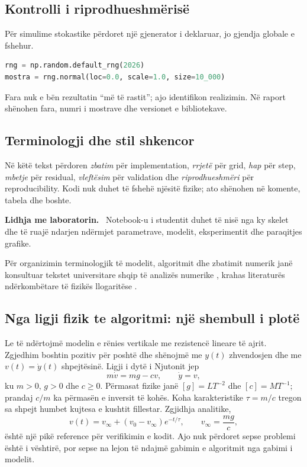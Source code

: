 \documentclass[11pt,oneside,openany]{book}
\newenvironment{lidhje}{\par\medskip\noindent\textbf{Lidhja me laboratorin.}\ }{\par\medskip}
\begin{document}
\subsection{Kontrolli i riprodhueshmërisë}
Për simulime stokastike përdoret një gjenerator i deklaruar, jo gjendja globale e fshehur.
\begin{lstlisting}[language=Python]
rng = np.random.default_rng(2026)
mostra = rng.normal(loc=0.0, scale=1.0, size=10_000)
\end{lstlisting}
Fara nuk e bën rezultatin ``më të rastit''; ajo identifikon realizimin. Në raport shënohen fara, numri i mostrave dhe versionet e bibliotekave.

\subsection{Terminologji dhe stil shkencor}
Në këtë tekst përdoren \emph{zbatim} për implementation, \emph{rrjetë} për grid, \emph{hap} për step, \emph{mbetje} për residual, \emph{vleftësim} për validation dhe \emph{riprodhueshmëri} për reproducibility. Kodi nuk duhet të fshehë njësitë fizike; ato shënohen në komente, tabela dhe boshte.

\begin{lidhje}
Notebook-u i studentit duhet të nisë nga ky skelet dhe të ruajë ndarjen ndërmjet parametrave, modelit, eksperimentit dhe paraqitjes grafike.
\end{lidhje}

Për organizimin terminologjik të modelit, algoritmit dhe zbatimit numerik janë konsultuar tekstet universitare shqip të analizës numerike \cite{hanelli,hoxha,datja}, krahas literaturës ndërkombëtare të fizikës llogaritëse \cite{newman,landau}.



\subsection{Nga ligji fizik te algoritmi: një shembull i plotë}
Le të ndërtojmë modelin e rënies vertikale me rezistencë lineare të ajrit. Zgjedhim boshtin pozitiv për poshtë dhe shënojmë me $y(t)$ zhvendosjen dhe me $v(t)=\dot y(t)$ shpejtësinë. Ligji i dytë i Njutonit jep
\begin{equation}
 m\dot v=mg-cv,\qquad \dot y=v,
\end{equation}
ku $m>0$, $g>0$ dhe $c\ge0$. Përmasat fizike janë $[g]=LT^{-2}$ dhe $[c]=MT^{-1}$; prandaj $c/m$ ka përmasën e inversit të kohës. Koha karakteristike $\tau=m/c$ tregon sa shpejt humbet kujtesa e kushtit fillestar. Zgjidhja analitike,
\begin{equation}
 v(t)=v_\infty+(v_0-v_\infty)e^{-t/\tau},\qquad v_\infty=\frac{mg}{c},
\end{equation}
është një pikë reference për verifikimin e kodit. Ajo nuk përdoret sepse problemi është i vështirë, por sepse na lejon të ndajmë gabimin e algoritmit nga gabimi i modelit.
\end{document}
